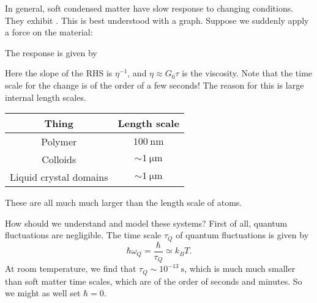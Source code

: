 \documentclass[a4paper]{article}
\begin{document}
In general, soft condensed matter have slow response to changing conditions. They exhibit . This is best understood with a graph. Suppose we suddenly apply a force on the material:
\begin{center}
\end{center}
The response is given by
\begin{center}
\end{center}
Here the slope of the RHS is $\eta^{-1}$, and $\eta \approx G_0 \tau$ is the viscosity. Note that the time scale for the change is of the order of a few seconds! The reason for this is large internal length scales.
\begin{center}
  \begin{tabular}{cc}
    \toprule
    Thing & Length scale \\
    \midrule
    Polymer & $\SI{100}{\nano\meter}$\\
    Colloids & $\sim\SI{1}{\micro\meter}$\\
    Liquid crystal domains & $\sim\SI{1}{\micro\meter}$\\
    \bottomrule
  \end{tabular}
\end{center}
These are all much much larger than the length scale of atoms.

How should we understand and model these systems? First of all, quantum fluctuations are negligible. The time scale $\tau_Q$ of quantum fluctuations is given by
\[
  \hbar \omega_Q = \frac{\hbar}{\tau_Q} \simeq k_B T.
\]
At room temperature, we find that $\tau_Q\sim 10^{-13}\SI{}{\second}$, which is much much smaller than soft matter time scales, which are of the order of seconds and minutes. So we might as well set $\hbar = 0$.
\end{document}
